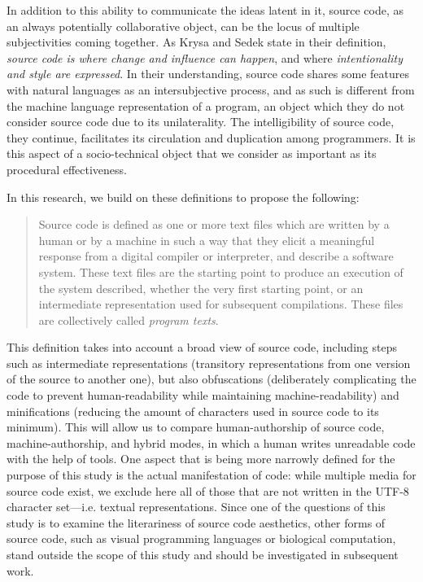 In addition to this ability to communicate the ideas latent in it, source code, as an always potentially collaborative object, can be the locus of multiple subjectivities coming together. As Krysa and Sedek state in their definition, \emph{source code is where change and influence can happen}, and where \emph{intentionality and style are expressed}\cite{fuller_software_2008}. In their understanding, source code shares some features with natural languages as an intersubjective process\cite{voloshinov_marxism_1986}, and as such is different from the machine language representation of a program, an object which they do not consider source code due to its unilaterality. The intelligibility of source code, they continue, facilitates its circulation and duplication among programmers. It is this aspect of a socio-technical object that we consider as important as its procedural effectiveness.

In this research, we build on these definitions to propose the following:

\begin{quote}
    Source code is defined as one or more text files which are written by a human or by a machine in such a way that they elicit a meaningful response from a digital compiler or interpreter, and describe a software system. These text files are the starting point to produce an execution of the system described, whether the very first starting point, or an intermediate representation used for subsequent compilations. These files are collectively called \emph{program texts}.
\end{quote}

This definition takes into account a broad view of source code, including steps such as intermediate representations (transitory representations from one version of the source to another one), but also obfuscations (deliberately complicating the code to prevent human-readability while maintaining machine-readability) and minifications (reducing the amount of characters used in source code to its minimum). This will allow us to compare human-authorship of source code, machine-authorship, and hybrid modes, in which a human writes unreadable code with the help of tools. One aspect that is being more narrowly defined for the purpose of this study is the actual manifestation of code: while multiple media for source code exist, we exclude here all of those that are not written in the UTF-8 character set—i.e. textual representations. Since one of the questions of this study is to examine the literariness of source code aesthetics, other forms of source code, such as visual programming languages or biological computation, stand outside the scope of this study and should be investigated in subsequent work.

